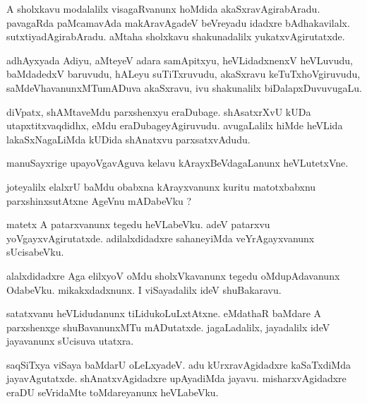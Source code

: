 \documentclass{article}
\begin{document}
\begin{mn}
A sholxkavu  modalalilx  visagaRvanunx  hoMdida  akaSxravAgirabAradu.  pavagaRda  paMcamavAda  makAravAgadeV  beVreyadu  idadxre  
bAdhakavilalx.  sutxtiyadAgirabAradu.  aMtaha  sholxkavu  shakunadalilx  yukatxvAgirutatxde.
\end{mn}

\begin{mn}
adhAyxyada  Adiyu,  aMteyeV  adara  samApitxyu,  heVLidadxnenxV  heVLuvudu,  baMdadedxV  baruvudu,  hALeyu  suTiTxruvudu,  akaSxravu  
keTuTxhoVgiruvudu,  saMdeVhavanunxMTumADuva  akaSxravu,  ivu  shakunalilx  biDalapxDuvuvugaLu.
\end{mn}

\begin{mn}
diVpatx,  shAMtaveMdu  parxshenxyu  eraDubage.  shAsatxrXvU  kUDa  utapxtitxvaqdidhx,  eMdu  eraDubageyAgiruvudu.  avugaLalilx  hiMde  
heVLida  lakaSxNagaLiMda  kUDida  shAnatxvu  parxsatxvAdudu.
\end{mn}

\begin{mn}
manuSayxrige  upayoVgavAguva  kelavu  kArayxBeVdagaLanunx  heVLutetxVne.
\end{mn}

\begin{mn}
joteyalilx  elalxrU baMdu  obabxna  kArayxvanunx  kuritu  matotxbabxnu  parxshinxsutAtxne  AgeVnu  mADabeVku ?
\end{mn}

\begin{mn}
matetx  A  patarxvanunx  tegedu  heVLabeVku.  adeV  patarxvu  yoVgayxvAgirutatxde.  adilalxdidadxre  sahaneyiMda veYrAgayxvanunx  sUcisabeVku.
\end{mn}

\begin{mn}
alalxdidadxre  Aga  elilxyoV  oMdu  sholxVkavanunx  tegedu  oMdupAdavanunx  OdabeVku.  mikakxdadxnunx.  I  viSayadalilx  ideV  shuBakaravu.  
\end{mn}

\begin{mn}
satatxvanu  heVLidudanunx  tiLidukoLuLxtAtxne.  eMdathaR  baMdare  A  parxshenxge  shuBavanunxMTu mADutatxde.  jagaLadalilx,  
jayadalilx  ideV  jayavanunx  sUcisuva  utatxra.
\end{mn}

\begin{mn}
saqSiTxya  viSaya  baMdarU  oLeLxyadeV. adu  kUrxravAgidadxre  kaSaTxdiMda  jayavAgutatxde. shAnatxvAgidadxre  
upAyadiMda  jayavu. misharxvAgidadxre  eraDU  seVridaMte  toMdareyanunx  heVLabeVku.     
\end{mn}
\end{document}
